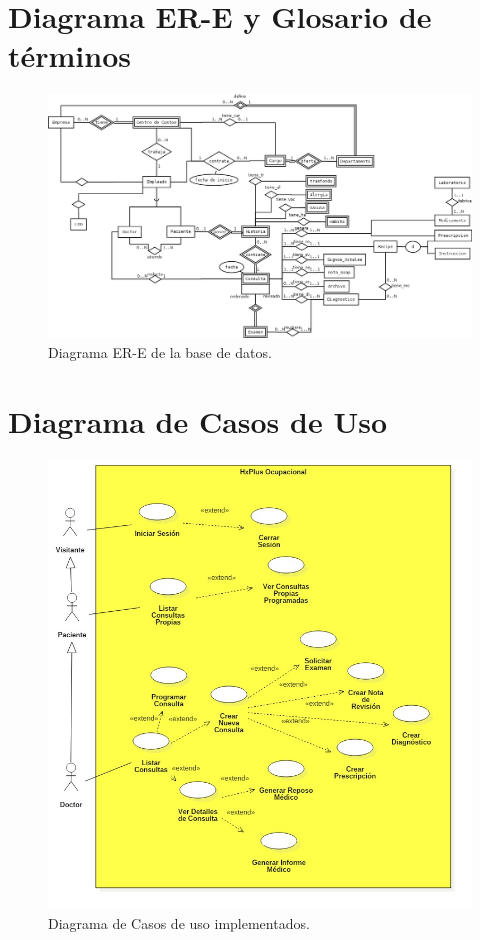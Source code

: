 \appendix

\chapter{Diagrama ER-E y Glosario de términos} \label{ere}

    

    \begin{figure}[h!]
        \begin{center}
            \includegraphics[scale=.4,angle=90]{figures/DiagramBD}
        \end{center}
        \caption{Diagrama ER-E de la base de datos.}
    \end{figure}
    
\chapter{Diagrama de Casos de Uso} \label{dcu}

    \begin{figure}[htbp!]
        \begin{center}
            \includegraphics[scale=.4]{figures/UseCaseDiagram1}
        \end{center}
        \caption{Diagrama de Casos de uso implementados.}
    \end{figure}

\pagebreak